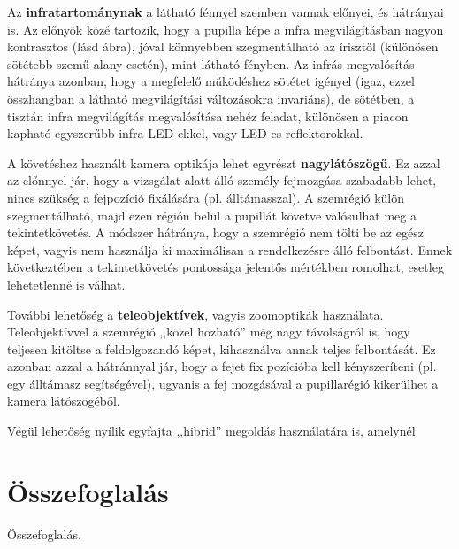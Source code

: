 Az \textbf{infratartománynak} a látható fénnyel szemben vannak előnyei, és hátrányai is. Az előnyök közé tartozik, hogy a pupilla képe a infra megvilágításban nagyon kontrasztos (lásd  ábra), jóval könnyebben szegmentálható az írisztől (különösen sötétebb szemű alany esetén), mint látható fényben. Az infrás megvalósítás hátránya azonban, hogy a megfelelő működéshez sötétet igényel (igaz, ezzel összhangban a látható megvilágítási változásokra invariáns), de sötétben, a tisztán infra megvilágítás megvalósítása nehéz feladat, különösen a piacon kapható egyszerűbb infra LED-ekkel, vagy LED-es reflektorokkal.

\bigskip

A követéshez használt kamera optikája lehet egyrészt \textbf{nagylátószögű}. Ez azzal az előnnyel jár, hogy a vizsgálat alatt álló személy fejmozgása szabadabb lehet, nincs szükség a fejpozíció fixálására (pl. álltámasszal). A szemrégió külön szegmentálható, majd ezen régión belül a pupillát követve valósulhat meg a tekintetkövetés. A módszer hátránya, hogy a szemrégió nem tölti be az egész képet, vagyis nem használja ki maximálisan a rendelkezésre álló felbontást. Ennek következtében a tekintetkövetés pontossága jelentős mértékben romolhat, esetleg lehetetlenné is válhat.

További lehetőség a \textbf{teleobjektívek}, vagyis zoomoptikák használata. Teleobjektívvel a szemrégió ,,közel hozható'' még nagy távolságról is, hogy teljesen kitöltse a feldolgozandó képet, kihasználva annak teljes felbontását. Ez azonban azzal a hátránnyal jár, hogy a fejet fix pozícióba kell kényszeríteni (pl. egy álltámasz segítségével), ugyanis a fej mozgásával a pupillarégió kikerülhet a kamera látószögéből.

Végül lehetőség nyílik egyfajta ,,hibrid'' megoldás használatára is, amelynél 


\section{Összefoglalás}\label{sect:hardver_osszefoglalas}

Összefoglalás.


